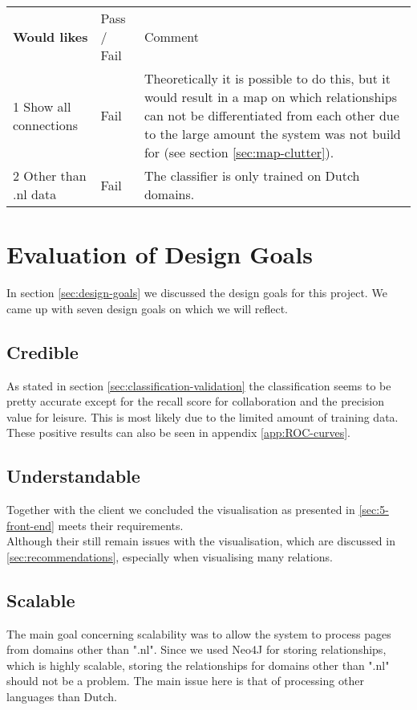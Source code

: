 \begin{table}[H]
\begin{tabular}{ll m{8cm}}
\textbf{Would likes}                    & Pass / Fail & Comment                                                                                                                                                                                                                               \\
1 Show all connections         & Fail        & Theoretically it is possible to do this, but it would result in a map on which relationships can not be differentiated from each other due to the large amount the system was not build for (see section \ref{sec:map-clutter}). \\ \hline
2 Other than .nl data          & Fail        & The classifier is only trained on Dutch domains.                                                                 
\end{tabular}
\end{table}

\section{Evaluation of Design Goals}
In section \ref{sec:design-goals} we discussed the design goals for this project. We came up with seven design goals on which we will reflect.

\subsection{Credible}
As stated in section \ref{sec:classification-validation} the classification seems to be pretty accurate except for the recall score for collaboration and the precision value for leisure. This is most likely due to the limited amount of training data. These positive results can also be seen in appendix \ref{app:ROC-curves}.

\subsection{Understandable}
Together with the client we concluded the visualisation as presented in \ref{sec:5-front-end} meets their requirements.\\
Although their still remain issues with the visualisation, which are discussed in \ref{sec:recommendations}, especially when visualising many relations.

\subsection{Scalable}
The main goal concerning scalability was to allow the system to process pages from domains other than ".nl". Since we used Neo4J for storing relationships, which is highly scalable, storing the relationships for domains other than ".nl" should not be a problem. The main issue here is that of processing other languages than Dutch.

